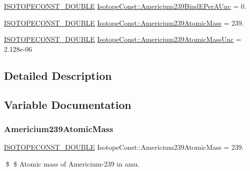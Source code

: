 \begin{DoxyCompactItemize}
\mbox{\hyperlink{group___isotope_const-_macros_ga8f45a7272ce02c0b4c65c44636ed719a}{I\+S\+O\+T\+O\+P\+E\+C\+O\+N\+S\+T\+\_\+\+D\+O\+U\+B\+LE}} \mbox{\hyperlink{group___isotope_const-_americium-_am239_ga1caca33625b5238402e9d33dc60918bf}{Isotope\+Const\+::\+Americium239\+Bind\+E\+Per\+A\+Unc}} = 0.
\item 
\mbox{\hyperlink{group___isotope_const-_macros_ga8f45a7272ce02c0b4c65c44636ed719a}{I\+S\+O\+T\+O\+P\+E\+C\+O\+N\+S\+T\+\_\+\+D\+O\+U\+B\+LE}} \mbox{\hyperlink{group___isotope_const-_americium-_am239_ga1fa27bb585d173d9aad0fb55d9224646}{Isotope\+Const\+::\+Americium239\+Atomic\+Mass}} = 239.
\item 
\mbox{\hyperlink{group___isotope_const-_macros_ga8f45a7272ce02c0b4c65c44636ed719a}{I\+S\+O\+T\+O\+P\+E\+C\+O\+N\+S\+T\+\_\+\+D\+O\+U\+B\+LE}} \mbox{\hyperlink{group___isotope_const-_americium-_am239_gaf7970e15c3c63ce47820deb10ca17773}{Isotope\+Const\+::\+Americium239\+Atomic\+Mass\+Unc}} = 2.\+128e-\/06
\end{DoxyCompactItemize}


\subsection{Detailed Description}


\subsection{Variable Documentation}
\mbox{\label{group___isotope_const-_americium-_am239_ga1fa27bb585d173d9aad0fb55d9224646}} 
\subsubsection{\texorpdfstring{Americium239\+Atomic\+Mass}{Americium239AtomicMass}}
{\footnotesize\ttfamily \mbox{\hyperlink{group___isotope_const-_macros_ga8f45a7272ce02c0b4c65c44636ed719a}{I\+S\+O\+T\+O\+P\+E\+C\+O\+N\+S\+T\+\_\+\+D\+O\+U\+B\+LE}} Isotope\+Const\+::\+Americium239\+Atomic\+Mass = 239.}

\$ \$ Atomic mass of Americium-\/239 in amu. \mbox{\label{group___isotope_const-_americium-_am239_gaf7970e15c3c63ce47820deb10ca17773}} 
